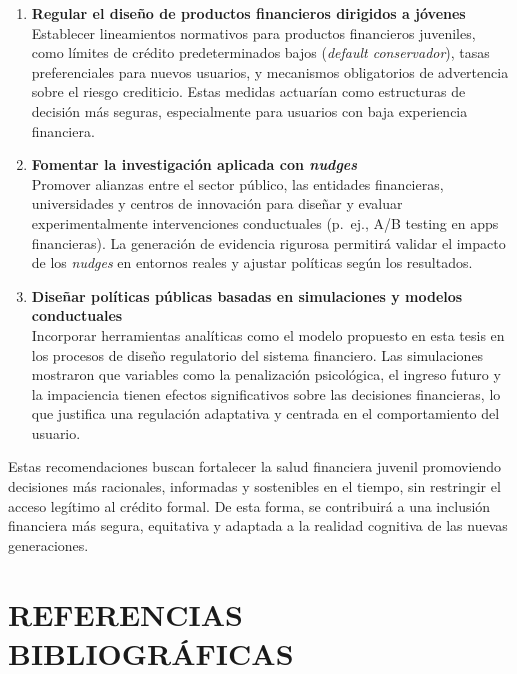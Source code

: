\documentclass[10pt]{article}
\begin{document}
\begin{multicols}{2}
\begin{enumerate}
    \item \textbf{Regular el diseño de productos financieros dirigidos a jóvenes} \\
    Establecer lineamientos normativos para productos financieros juveniles, como límites de crédito predeterminados bajos (\textit{default conservador}), tasas preferenciales para nuevos usuarios, y mecanismos obligatorios de advertencia sobre el riesgo crediticio. Estas medidas actuarían como estructuras de decisión más seguras, especialmente para usuarios con baja experiencia financiera.

    \item \textbf{Fomentar la investigación aplicada con \textit{nudges}} \\
    Promover alianzas entre el sector público, las entidades financieras, universidades y centros de innovación para diseñar y evaluar experimentalmente intervenciones conductuales (p.\ ej., A/B testing en apps financieras). La generación de evidencia rigurosa permitirá validar el impacto de los \textit{nudges} en entornos reales y ajustar políticas según los resultados.

    \item \textbf{Diseñar políticas públicas basadas en simulaciones y modelos conductuales} \\
    Incorporar herramientas analíticas como el modelo propuesto en esta tesis en los procesos de diseño regulatorio del sistema financiero. Las simulaciones mostraron que variables como la penalización psicológica, el ingreso futuro y la impaciencia tienen efectos significativos sobre las decisiones financieras, lo que justifica una regulación adaptativa y centrada en el comportamiento del usuario.

\end{enumerate}

Estas recomendaciones buscan fortalecer la salud financiera juvenil promoviendo decisiones más racionales, informadas y sostenibles en el tiempo, sin restringir el acceso legítimo al crédito formal. De esta forma, se contribuirá a una inclusión financiera más segura, equitativa y adaptada a la realidad cognitiva de las nuevas generaciones.



\section{REFERENCIAS BIBLIOGRÁFICAS}
\begin{thebibliography}{99}


\end{thebibliography}
\end{multicols}
\end{document}
